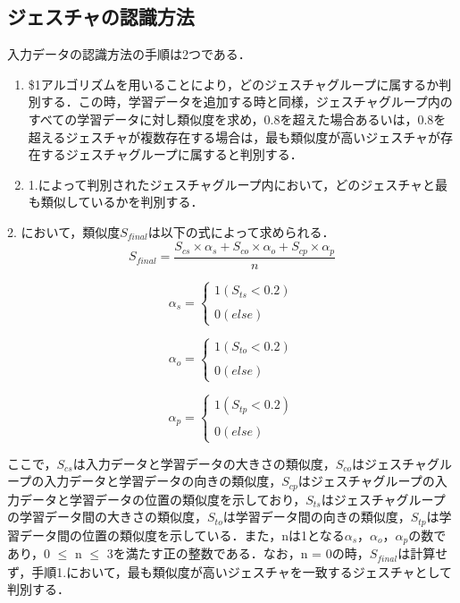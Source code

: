 \subsection{ジェスチャの認識方法}
入力データの認識方法の手順は2つである．
\begin{enumerate}
\item \$1アルゴリズムを用いることにより，どのジェスチャグループに属するか判別する．この時，学習データを追加する時と同様，ジェスチャグループ内のすべての学習データに対し類似度を求め，0.8を超えた場合あるいは，0.8を超えるジェスチャが複数存在する場合は，最も類似度が高いジェスチャが存在するジェスチャグループに属すると判別する．
\item 1.によって判別されたジェスチャグループ内において，どのジェスチャと最も類似しているかを判別する．
\end{enumerate}
2. において，類似度$S_\textit{final}$は以下の式によって求められる．
\begin{equation}
S_\textit{final} = \frac{S_\textit{cs} \times α_\textit{s} + S_\textit{co} \times α_\textit{o} + S_\textit{cp} \times α_\textit{p}}{n}
\end{equation}

\begin{equation}
α_\textit{s}= \left \{
\begin{array}{l}
1 (S_\textit{ts}<0.2) \\\\
0 (else)
\end{array}
\right.
\end{equation}

\begin{equation}
α_\textit{o}= \left \{
\begin{array}{l}
1 (S_\textit{to}<0.2) \\\\
0 (else)
\end{array}
\right.
\end{equation}

\begin{equation}
α_\textit{p} = \left \{
\begin{array}{l}
1 (S_\textit{tp}<0.2) \\\\
0 (else)
\end{array}
\right.
\end{equation}

ここで，$S_\textit{cs}$は入力データと学習データの大きさの類似度，$S_\textit{co}$はジェスチャグループの入力データと学習データの向きの類似度，$S_\textit{cp}$はジェスチャグループの入力データと学習データの位置の類似度を示しており，$S_\textit{ts}$はジェスチャグループの学習データ間の大きさの類似度，$S_\textit{to}$は学習データ間の向きの類似度，$S_\textit{tp}$は学習データ間の位置の類似度を示している．また，nは1となる$α_\textit{s}$，$α_\textit{o}$，$α_\textit{p}$の数であり，0 $\leq$ n $\leq$ 3を満たす正の整数である．なお，n = 0の時，$S_\textit{final}$は計算せず，手順1.において，最も類似度が高いジェスチャを一致するジェスチャとして判別する．

